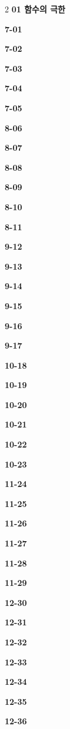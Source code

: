 \documentclass[10pt,a4paper]{article}
\begin{document}
\begin{multicols}{2}\small
\noindent\textbf{01 함수의 극한}\par\smallskip
\noindent\textbf{7-01}\ \par
\noindent\textbf{7-02}\ \par
\noindent\textbf{7-03}\ \par
\noindent\textbf{7-04}\ \par
\noindent\textbf{7-05}\ \par
\noindent\textbf{8-06}\ \par
\noindent\textbf{8-07}\ \par
\noindent\textbf{8-08}\ \par
\noindent\textbf{8-09}\ \par
\noindent\textbf{8-10}\ \par
\noindent\textbf{8-11}\ \par
\noindent\textbf{9-12}\ \par
\noindent\textbf{9-13}\ \par
\noindent\textbf{9-14}\ \par
\noindent\textbf{9-15}\ \par
\noindent\textbf{9-16}\ \par
\noindent\textbf{9-17}\ \par
\noindent\textbf{10-18}\ \par
\noindent\textbf{10-19}\ \par
\noindent\textbf{10-20}\ \par
\noindent\textbf{10-21}\ \par
\noindent\textbf{10-22}\ \par
\noindent\textbf{10-23}\ \par
\noindent\textbf{11-24}\ \par
\noindent\textbf{11-25}\ \par
\noindent\textbf{11-26}\ \par
\noindent\textbf{11-27}\ \par
\noindent\textbf{11-28}\ \par
\noindent\textbf{11-29}\ \par
\noindent\textbf{12-30}\ \par
\noindent\textbf{12-31}\ \par
\noindent\textbf{12-32}\ \par
\noindent\textbf{12-33}\ \par
\noindent\textbf{12-34}\ \par
\noindent\textbf{12-35}\ \par
\noindent\textbf{12-36}\ \par

\end{multicols}
\end{document}

